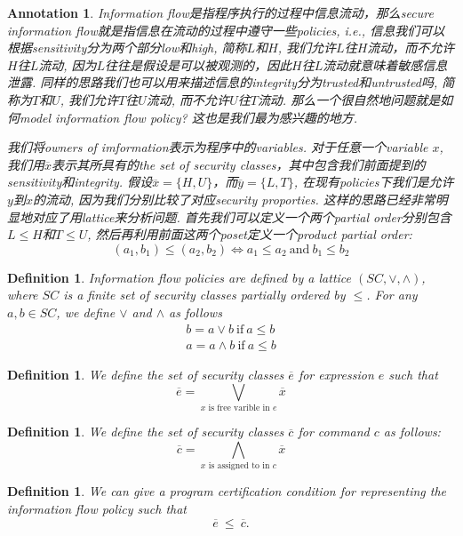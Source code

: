 \documentclass{article}
\newtheorem{definition}[theorem]{Definition}
\newtheorem{annotation}[theorem]{Annotation}
\begin{document}
\begin{annotation}
\rm Information flow是指程序执行的过程中信息流动，那么secure information flow就是指信息在流动的过程中遵守一些policies, i.e., 信息我们可以根据sensitivity分为两个部分low和high, 简称$L$和$H$, 我们允许$L$往$H$流动，而不允许$H$往$L$流动, 因为$L$往往是假设是可以被观测的，因此$H$往$L$流动就意味着敏感信息泄露. 同样的思路我们也可以用来描述信息的integrity分为trusted和untrusted吗, 简称为$T$和$U$, 我们允许$T$往$U$流动, 而不允许$U$往$T$流动. 那么一个很自然地问题就是如何model information flow policy? 这也是我们最为感兴趣的地方. 

我们将owners of imformation表示为程序中的variables. 对于任意一个variable $x$, 我们用$\overline{x}$表示其所具有的the set of security classes，其中包含我们前面提到的sensitivity和integrity. 假设$\overline{x} = \{H,U\}$，而$\overline{y} = \{L, T\}$, 在现有policies下我们是允许$y$到$x$的流动, 因为我们分别比较了对应security proporties. 这样的思路已经非常明显地对应了用lattice来分析问题\cite{DL}. 首先我们可以定义一个两个partial order分别包含$L \leq H$和$T \leq U$, 然后再利用前面这两个poset定义一个product partial order:
\[
	(a_1, b_1) \leq (a_2, b_2) \iff a_1 \leq a_2 ~\text{and}~b_1 \leq b_2 
\]
\end{annotation}

\begin{definition}
\rm Information flow policies are defined by a lattice $(SC, \vee, \wedge)$, where $SC$ is a finite set of security classes partially ordered by $\leq$. For any $a,b \in SC$, we define $\vee$ and $\wedge$ as follows
\[
	\begin{gathered}
	b = a \vee b ~\text{if}~  a \leq b \\
	a = a \wedge b ~\text{if}~  a \leq b	
	\end{gathered}
\]
\end{definition}

\begin{definition}
\rm We define the set of security classes $\overline{e}$ for expression $e$ such that 
\[
\overline{e} = \bigvee\limits_{\text{$x$ is free varible in $e$}} \overline{x}
\]
\end{definition}

\begin{definition}
\rm We define the set of security classes $\overline{c}$ for command $c$ as follows:
\[
	\overline{c} = \bigwedge\limits_{\text{$x$ is assigned to in $c$}} \overline{x}
\]
\end{definition}

\begin{definition}
\rm We can give a program certification condition for representing the information flow policy such that
\[
	\overline{e} ~\leq~ \overline{c}.
\]
\end{definition}
\end{document}
